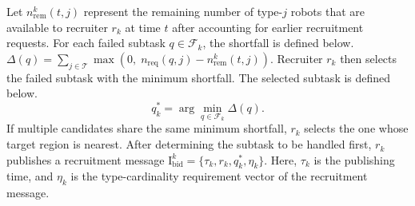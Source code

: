 \documentclass[lettersize,journal]{IEEEtran}
\begin{document}

Let $n_{\mathrm{rem}}^{k}(t,j)$ represent the remaining number of type-$j$ robots that are available to recruiter $r_k$ at time $t$ after accounting for earlier recruitment requests.
For each failed subtask $q \in \mathcal{F}_k$, the shortfall is defined below.
$
\Delta(q)
=
\sum_{j \in \mathcal{T}}
\max\!\left(0,\;n_{\mathrm{req}}(q,j)-n_{\mathrm{rem}}^{k}(t,j)\right).
$
Recruiter $r_k$ then selects the failed subtask with the minimum shortfall. The selected subtask is defined below.
\begin{equation}
q_k^\ast
=
\arg\min_{q \in \mathcal{F}_k}
\Delta(q).
\end{equation}
If multiple candidates share the same minimum shortfall, $r_k$ selects the one whose target region is nearest. After determining the subtask to be handled first, $r_k$ publishes a recruitment message $\mathrm{I}_{\mathrm{bid}}^k=\{\tau_k, r_k, q_k^\ast, \eta_k\}$.
Here, $\tau_k$ is the publishing time, and $\eta_k$ is the type-cardinality requirement vector of the recruitment message.
\end{document}
